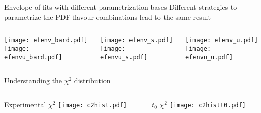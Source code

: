 \begin{frame}{Envelope of fits with different parametrization bases}
    Different strategies to parametrize the PDF flavour combinations lead to the same result
    \vspace*{-1em}
    \begin{columns}
        \begin{column}[T]{0.32\textwidth}
          \begin{center}
              \texttt{[image: efenv\_bard.pdf]} \\
              \texttt{[image: efenvu\_bard.pdf]} 
          \end{center}
        \end{column}
        \begin{column}[t]{0.32\textwidth}
          \begin{center}
              \texttt{[image: efenv\_s.pdf]} \\
              \texttt{[image: efenvu\_s.pdf]} 
          \end{center}
        \end{column}
        \begin{column}[t]{0.32\textwidth}
            \begin{center}
                \texttt{[image: efenv\_u.pdf]} \\
                \texttt{[image: efenvu\_u.pdf]} 
            \end{center}
          \end{column}
    \end{columns}
\end{frame}


\begin{frame}{Understanding the $\chi^2$ distribution}
    \begin{columns}
        \begin{column}[T]{0.48\textwidth}
            \centering
            Experimental $\chi^2$
            \texttt{[image: c2hist.pdf]}
        \end{column}
        \begin{column}[T]{0.48\textwidth}
            \centering
            $t_0$ $\chi^2$
            \texttt{[image: c2histt0.pdf]}
        \end{column}
    \end{columns}
\end{frame}


